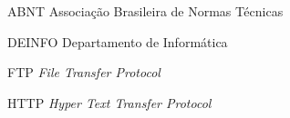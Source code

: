 
\begin{siglas}
    \item[ABNT] Associação Brasileira de Normas Técnicas
    \item[DEINFO] Departamento de Informática
    \item[FTP] \textit{File Transfer Protocol}
    \item[HTTP] \textit{Hyper Text Transfer Protocol}
\end{siglas}

